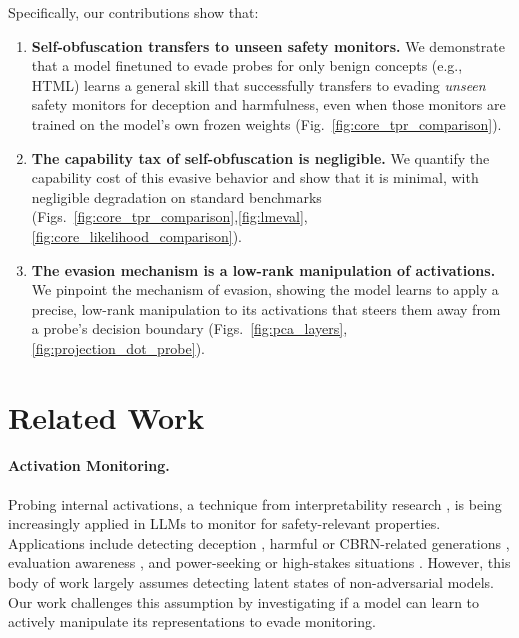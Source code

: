 \documentclass{article} %
\begin{document}
Specifically, our contributions show that:
\begin{enumerate}
    \item \textbf{Self-obfuscation transfers to unseen safety monitors.} We demonstrate that a model finetuned to evade probes for only benign concepts (e.g., HTML) learns a general skill that successfully transfers to evading \emph{unseen} safety monitors for deception and harmfulness, even when those monitors are trained on the model's own frozen weights (Fig.~\ref{fig:core_tpr_comparison}).

    \item \textbf{The capability tax of self-obfuscation is negligible.} We quantify the capability cost of this evasive behavior and show that it is minimal, with negligible degradation on standard benchmarks (Figs.~\ref{fig:core_tpr_comparison},\ref{fig:lmeval},\ref{fig:core_likelihood_comparison}).

    \item \textbf{The evasion mechanism is a low-rank manipulation of activations.} We pinpoint the mechanism of evasion, showing the model learns to apply a precise, low-rank manipulation to its activations that steers them away from a probe's decision boundary (Figs.~\ref{fig:pca_layers}, \ref{fig:projection_dot_probe}).
\end{enumerate}


\section{Related Work} \label{sec:related-work}

\paragraph{Activation Monitoring.} Probing internal activations, a technique from interpretability research \citep{alain2016understanding, belinkov2022probing}, is being increasingly applied in LLMs to monitor for safety-relevant properties. Applications include detecting deception \citep{goldowsky2025detecting, azaria2023internalstatellmknows, marks2024geometry, cundy2025preferencelearningliedetectors}, harmful or CBRN-related generations \citep{tillman2025investigatingtaskspecificpromptssparse, cunningham2025costeffective}, evaluation awareness \citep{abdelnabi2025linearcontroltestawareness, nguyen2025probingsteeringevaluationawareness}, and power-seeking or high-stakes situations \citep{roger2023coupprobes, zou2023representation, mckenzie2025detectinghighstakesinteractionsactivation}. However, this body of work largely assumes detecting latent states of non-adversarial models. Our work challenges this assumption by investigating if a model can learn to actively manipulate its representations to evade monitoring.
\end{document}
